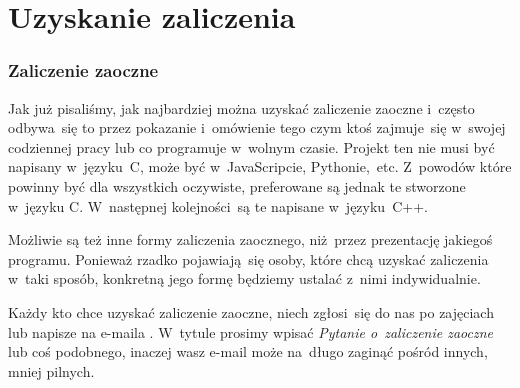 \documentclass[10pt,t]{beamer}
\begin{document}
\section{Uzyskanie zaliczenia}


\begin{frame}
  \frametitle{Zaliczenie zaoczne}


  Jak już pisaliśmy, jak najbardziej można uzyskać zaliczenie zaoczne
  i~często odbywa~się to przez pokazanie i~omówienie tego czym ktoś
  zajmuje~się w~swojej codziennej pracy lub co programuje w~wolnym czasie.
  Projekt ten \alert{nie musi} być napisany w~języku~C, może być
  w~JavaScripcie, Pythonie,~etc. Z~powodów które powinny być dla wszystkich
  oczywiste, preferowane są jednak te stworzone w~języku C. W~następnej
  kolejności~są te napisane w~języku~C++.

  Możliwie są też inne formy zaliczenia zaocznego, niż~przez prezentację
  jakiegoś programu. Ponieważ rzadko pojawiają~się osoby, które chcą
  uzyskać zaliczenia w~taki sposób, konkretną jego formę będziemy ustalać
  z~nimi indywidualnie.

  Każdy kto chce uzyskać zaliczenie zaoczne, niech zgłosi~się do nas po
  zajęciach lub napisze na e-maila \email. W~tytule prosimy wpisać
  \textit{Pytanie o~zaliczenie zaoczne} lub coś podobnego, inaczej wasz
  e-mail może na~długo zaginąć pośród innych, mniej pilnych.

\end{frame}
\end{document}
